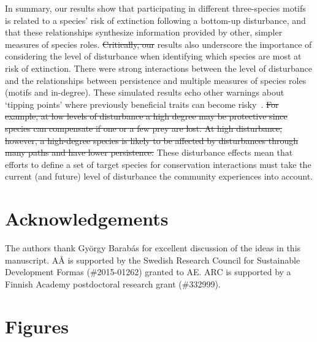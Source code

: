 \documentclass[12pt]{article}
\providecommand{\DIFadd}[1]{{\protect\color{blue}\uwave{#1}}} %
\providecommand{\DIFdel}[1]{{\protect\color{red}\sout{#1}}}                      %
\providecommand{\DIFaddbegin}{} %
\providecommand{\DIFaddend}{} %
\providecommand{\DIFdelbegin}{} %
\providecommand{\DIFdelend}{} %
\newcommand{\DIFscaledelfig}{0.5}
\newlength{\DIFdelgraphicswidth} %
\newlength{\DIFdelgraphicsheight} %
\newcommand{\DIFaddincludegraphics}[2][]{{\color{blue}\fbox{\DIFOincludegraphics[#1]{#2}}}} %
\newcommand{\DIFdelincludegraphics}[2][]{%
\sbox{\DIFdelgraphicsbox}{\DIFOincludegraphics[#1]{#2}}%
\settoboxwidth{\DIFdelgraphicswidth}{\DIFdelgraphicsbox} %
\settoboxtotalheight{\DIFdelgraphicsheight}{\DIFdelgraphicsbox} %
\scalebox{\DIFscaledelfig}{%
\parbox[b]{\DIFdelgraphicswidth}{\usebox{\DIFdelgraphicsbox}\\[-\baselineskip] \rule{\DIFdelgraphicswidth}{0em}}\llap{\resizebox{\DIFdelgraphicswidth}{\DIFdelgraphicsheight}{%
\setlength{\unitlength}{\DIFdelgraphicswidth}%
\begin{picture}(1,1)%
\thicklines\linethickness{2pt} %
{\color[rgb]{1,0,0}\put(0,0){\framebox(1,1){}}}%
{\color[rgb]{1,0,0}\put(0,0){\line( 1,1){1}}}%
{\color[rgb]{1,0,0}\put(0,1){\line(1,-1){1}}}%
\end{picture}%
}\hspace*{3pt}}} %
} %
\DeclareRobustCommand{\DIFaddbegin}{\DIFOaddbegin \let\includegraphics\DIFaddincludegraphics} %
\DeclareRobustCommand{\DIFaddend}{\DIFOaddend \let\includegraphics\DIFOincludegraphics} %
\DeclareRobustCommand{\DIFdelbegin}{\DIFOdelbegin \let\includegraphics\DIFdelincludegraphics} %
\DeclareRobustCommand{\DIFdelend}{\DIFOaddend \let\includegraphics\DIFOincludegraphics} %
\begin{document}
\begin{spacing}{2.0}
    In summary, our results show that participating in different three-species motifs is related to a species' risk of extinction following a bottom-up disturbance, and that these relationships synthesize information provided by other, simpler measures of species roles.
    \DIFdelbegin \DIFdel{Critically, our }\DIFdelend \DIFaddbegin \DIFadd{Our }\DIFaddend results also underscore the importance of considering the level of disturbance when identifying which species are most at risk of extinction.
    There were strong interactions between the level of disturbance and the relationships between persistence and multiple measures of species roles (motifs and in-degree).
    These simulated results echo other warnings about `tipping points' where previously beneficial traits can become risky~\citep{Latty2019,Golubski2016,Tylianakis2014}.
    \DIFdelbegin \DIFdel{For example, at low levels of disturbance a high degree may be protective since species can compensate if one or a few prey are lost. 
    At high disturbance, however, a high-degree species is likely to be affected by disturbances through many paths and have lower persistence.
    }\DIFdelend These disturbance effects mean that efforts to define a set of target species for conservation interactions must take the current (and future) level of disturbance the community experiences into account.

\section*{Acknowledgements}

    The authors thank Gy\"{o}rgy Barab\'{a}s for excellent discussion of the ideas in this manuscript. 
    A{\AA} is supported by the Swedish Research Council for Sustainable Development Formas (\#2015-01262) granted to AE. ARC is supported by a Finnish Academy postdoctoral research grant (\#332999).

\clearpage    

\section*{Figures}


\end{spacing}
\end{document}

